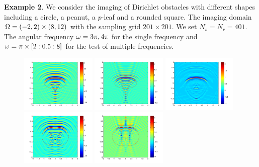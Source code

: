 \documentclass[12pt]{iopart}
\begin{document}
{\bigskip
\textbf{Example 2}. We consider the imaging of Dirichlet obstacles with different shapes including a circle, a peanut, a $p$-leaf and a rounded square. The imaging domain $\Omega = (-2, 2) \times (8, 12)$ with the sampling grid $201 \times 201$. We set $N_s = N_r = 401$. The angular frequency $\omega = 3\pi,4\pi$ for the single frequency and $\omega=\pi\times[2:0.5:8]$ for the test of multiple frequencies.

\begin{figure}
	\centering
	\includegraphics[width=0.32\textwidth]{./graphic/circle_3pi-eps-converted-to.pdf}
	\includegraphics[width=0.32\textwidth]{./graphic/circle_5pi-eps-converted-to.pdf}
	\includegraphics[width=0.32\textwidth]{./graphic/circle-eps-converted-to.pdf}
	\includegraphics[width=0.32\textwidth]{./graphic/peanut_3pi-eps-converted-to.pdf}
	\includegraphics[width=0.32\textwidth]{./graphic/peanut_5pi-eps-converted-to.pdf}

\end{figure}}
\end{document}
